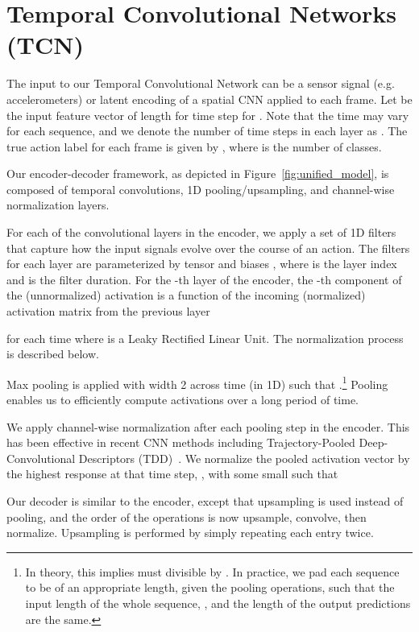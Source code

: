 \documentclass[10pt,twocolumn,letterpaper]{article}
\begin{document}
 \section{Temporal Convolutional Networks (TCN)}
\label{sec:TCN}

The input to our Temporal Convolutional Network can be a sensor signal (e.g. accelerometers) or latent encoding of a spatial CNN applied to each frame. Let  be the input feature vector of length  for time step  for . Note that the time  may vary for each sequence, and we denote the number of time steps in each layer as . The true action label for each frame is given by , where  is the number of classes.

Our encoder-decoder framework, as depicted in Figure~\ref{fig:unified_model}, is composed of temporal convolutions, 1D pooling/upsampling, and channel-wise normalization layers.




For each of the  convolutional layers in the encoder, we apply a set of 1D  filters that capture how the input signals evolve over the course of an action.
The filters for each layer are parameterized by tensor  and biases , where  is the layer index and  is the filter duration. 
For the -th layer of the encoder, the -th component of the (unnormalized) activation  is a function of the incoming (normalized) activation matrix  from the previous layer

for each time  where  is a Leaky Rectified Linear Unit. The normalization process is described below.


Max pooling  is applied with width 2 across time (in 1D) such that .\footnote{In theory, this implies  must divisible by . In practice, we pad each sequence to be of an appropriate length, given the pooling operations, such that the input length of the whole sequence, , and the length of the output predictions are the same.}
Pooling enables us to efficiently compute activations over a long period of time.


We apply channel-wise normalization after each pooling step in the encoder. This has been effective in recent CNN methods including Trajectory-Pooled Deep-Convolutional Descriptors (TDD)~\cite{TDD}. We normalize the pooled activation vector  by the highest response at that time step, , with some small  such that


Our decoder is similar to the encoder, except that upsampling is used instead of pooling, and the order of the operations is now upsample, convolve, then normalize.  Upsampling is performed by simply repeating each entry twice. 
\end{document}

